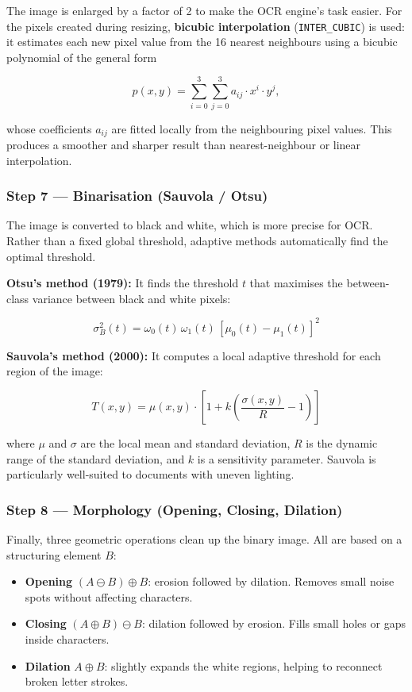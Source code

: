 \documentclass[12pt, a4paper]{article}
\begin{document}
The image is enlarged by a factor of 2 to make the OCR engine's task easier. For the pixels created during resizing, \textbf{bicubic interpolation} (\texttt{INTER\_CUBIC}) is used: it estimates each new pixel value from the 16 nearest neighbours using a bicubic polynomial of the general form

\[
p(x, y) = \sum_{i=0}^{3} \sum_{j=0}^{3} a_{ij} \cdot x^i \cdot y^j ,
\]

whose coefficients $a_{ij}$ are fitted locally from the neighbouring pixel values. This produces a smoother and sharper result than nearest-neighbour or linear interpolation.

\subsubsection*{Step 7 --- Binarisation (Sauvola / Otsu)}

The image is converted to black and white, which is more precise for OCR. Rather than a fixed global threshold, adaptive methods automatically find the optimal threshold.

\textbf{Otsu's method (1979):} It finds the threshold $t$ that maximises the between-class variance between black and white pixels:

\[
\sigma_B^2(t) = \omega_0(t)\,\omega_1(t)\,\left[\mu_0(t) - \mu_1(t)\right]^2
\]

\textbf{Sauvola's method (2000):} It computes a local adaptive threshold for each region of the image:

\[
T(x,y) = \mu(x,y) \cdot \left[1 + k \left(\frac{\sigma(x,y)}{R} - 1\right)\right]
\]

where $\mu$ and $\sigma$ are the local mean and standard deviation, $R$ is the dynamic range of the standard deviation, and $k$ is a sensitivity parameter. Sauvola is particularly well-suited to documents with uneven lighting.

\subsubsection*{Step 8 --- Morphology (Opening, Closing, Dilation)}

Finally, three geometric operations clean up the binary image. All are based on a structuring element $B$:

\begin{itemize}
  \item \textbf{Opening} $(A \ominus B) \oplus B$: erosion followed by dilation. Removes small noise spots without affecting characters.
  \item \textbf{Closing} $(A \oplus B) \ominus B$: dilation followed by erosion. Fills small holes or gaps inside characters.
  \item \textbf{Dilation} $A \oplus B$: slightly expands the white regions, helping to reconnect broken letter strokes.
\end{itemize}
\end{document}
